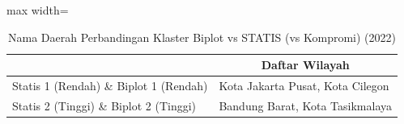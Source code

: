 \begin{table}[H]
\centering
\caption{Nama Daerah Perbandingan Klaster Biplot vs STATIS (vs Kompromi) (2022)} \label{tab:sample1biplot_statis_name_2022}
\begin{adjustbox}{max width=\textwidth}
\begin{tabular}{|>{\centering\arraybackslash}p{4cm}|p{10cm}|}
\hline
\multicolumn{1}{|c|}{\textbf{Kategori}} & \multicolumn{1}{c|}{\textbf{Daftar Wilayah}} \\
\hline
Statis 1 (Rendah) \& Biplot 1 (Rendah) & Kota Jakarta Pusat, Kota Cilegon \\
\hline
Statis 2 (Tinggi) \& Biplot 2 (Tinggi) & Bandung Barat, Kota Tasikmalaya \\
\hline
\end{tabular}
\end{adjustbox}
\end{table}